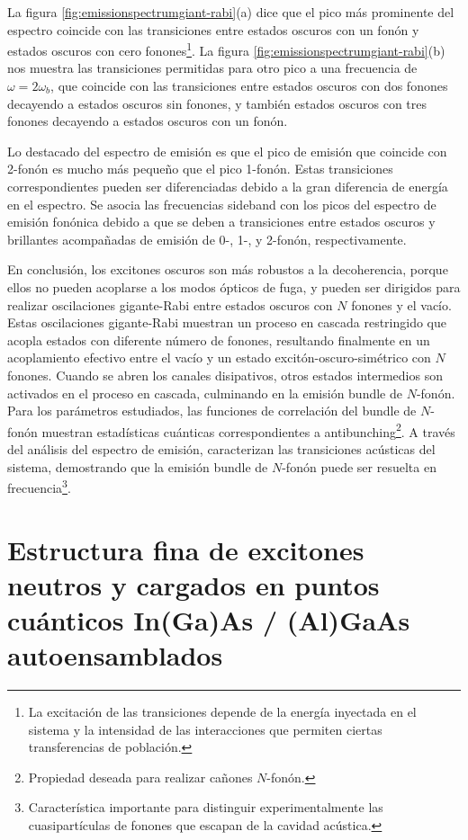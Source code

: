 \documentclass[main.tex]{subfiles}
\begin{document}
La figura \ref{fig:emissionspectrumgiant-rabi}(a) dice que  el pico más prominente del espectro coincide con las transiciones  entre estados oscuros con un fonón y estados oscuros con cero fonones\footnote{La excitación de las transiciones depende de la energía inyectada en el sistema y la intensidad de las interacciones que permiten ciertas transferencias de población.}. La figura \ref{fig:emissionspectrumgiant-rabi}(b) nos muestra las transiciones permitidas para otro pico a una frecuencia de $\omega = 2\omega_b$, que coincide con las transiciones entre estados oscuros con dos fonones decayendo a estados oscuros sin fonones, y también estados oscuros con tres fonones decayendo a estados oscuros con un fonón. 

Lo destacado del espectro de emisión es que el pico de emisión que coincide con 2-fonón es mucho más pequeño que el pico 1-fonón. Estas transiciones correspondientes pueden ser diferenciadas debido a la gran diferencia de energía en el espectro. Se asocia las frecuencias sideband con los picos del espectro de emisión fonónica debido a que se deben a transiciones entre estados oscuros y brillantes acompañadas de emisión de 0-, 1-, y 2-fonón, respectivamente.

En conclusión, los excitones oscuros son más robustos a la decoherencia, porque ellos no pueden acoplarse a los modos ópticos de fuga, y pueden ser dirigidos para realizar oscilaciones gigante-Rabi entre estados oscuros con $N$ fonones y el vacío. Estas oscilaciones gigante-Rabi muestran un proceso en cascada restringido que acopla estados con diferente número de fonones, resultando finalmente en un acoplamiento efectivo entre el vacío y un estado excitón-oscuro-simétrico con $N$ fonones. Cuando se abren los canales disipativos, otros estados intermedios son activados en el proceso en cascada, culminando en la emisión bundle de $N$-fonón. Para los parámetros estudiados, las funciones de correlación del bundle de $N$-fonón muestran estadísticas cuánticas correspondientes a antibunching\footnote{Propiedad deseada para realizar cañones $N$-fonón.}. A través del análisis del espectro de emisión, caracterizan las transiciones acústicas del sistema, demostrando que la emisión bundle de $N$-fonón puede ser resuelta en frecuencia\footnote{Característica importante para distinguir experimentalmente las cuasipartículas de fonones que escapan de la cavidad acústica.}.

%
\section{Estructura fina de excitones neutros y cargados en puntos cuánticos In(Ga)As / (Al)GaAs autoensamblados}
\end{document}
